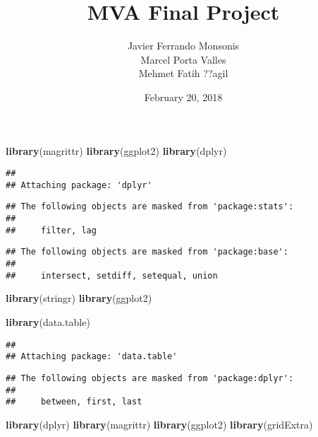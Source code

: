\documentclass[]{article}
\title{MVA Final Project}
\author{Javier Ferrando Monsonis \\ Marcel Porta Valles \\ Mehmet Fatih ??agil}
\date{February 20, 2018}
\newenvironment{Shaded}{\begin{snugshade}}{\end{snugshade}}
\newcommand{\KeywordTok}[1]{\textcolor[rgb]{0.13,0.29,0.53}{\textbf{#1}}}
\newcommand{\NormalTok}[1]{#1}
\begin{document}
\maketitle

\begin{Shaded}
\begin{Highlighting}[]
\KeywordTok{library}\NormalTok{(magrittr)}
\KeywordTok{library}\NormalTok{(ggplot2)}
\KeywordTok{library}\NormalTok{(dplyr)}
\end{Highlighting}
\end{Shaded}

\begin{verbatim}
## 
## Attaching package: 'dplyr'
\end{verbatim}

\begin{verbatim}
## The following objects are masked from 'package:stats':
## 
##     filter, lag
\end{verbatim}

\begin{verbatim}
## The following objects are masked from 'package:base':
## 
##     intersect, setdiff, setequal, union
\end{verbatim}

\begin{Shaded}
\begin{Highlighting}[]
\KeywordTok{library}\NormalTok{(stringr)}
\KeywordTok{library}\NormalTok{(ggplot2)}

\KeywordTok{library}\NormalTok{(data.table)}
\end{Highlighting}
\end{Shaded}

\begin{verbatim}
## 
## Attaching package: 'data.table'
\end{verbatim}

\begin{verbatim}
## The following objects are masked from 'package:dplyr':
## 
##     between, first, last
\end{verbatim}

\begin{Shaded}
\begin{Highlighting}[]
\KeywordTok{library}\NormalTok{(dplyr)}
\KeywordTok{library}\NormalTok{(magrittr)}
\KeywordTok{library}\NormalTok{(ggplot2)}
\KeywordTok{library}\NormalTok{(gridExtra)}
\end{Highlighting}
\end{Shaded}
\end{document}
